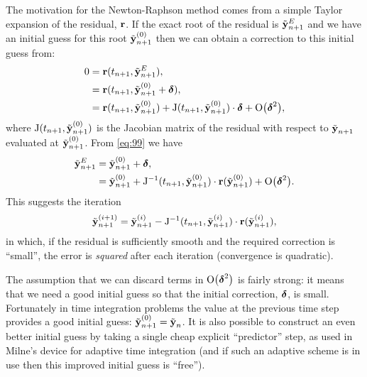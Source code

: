 The motivation for the Newton-Raphson method comes from a simple Taylor expansion of the residual, $\boldsymbol{\mathrm{r}}$.
If the exact root of the residual is $\tilde{\boldsymbol{\mathrm{y}}}^E_{n+1}$ and we have an initial guess for this root ${\tilde{\boldsymbol{\mathrm{y}}}_{n+1}}^{(0)}$ then we can obtain a correction to this initial guess from:
\begin{equation}
  \begin{aligned}
    0 &= \boldsymbol{\mathrm{r}}(t_{n+1},\tilde{\boldsymbol{\mathrm{y}}}^E_{n+1}), \\
    &= \boldsymbol{\mathrm{r}}(t_{n+1}, {\tilde{\boldsymbol{\mathrm{y}}}_{n+1}}^{(0)} + \boldsymbol{\mathrm{\delta}}), \\
    &= \boldsymbol{\mathrm{r}}(t_{n+1}, {\tilde{\boldsymbol{\mathrm{y}}}_{n+1}}^{(0)}) + \mathrm{J}(t_{n+1}, {\tilde{\boldsymbol{\mathrm{y}}}_{n+1}}^{(0)}) \cdot \boldsymbol{\mathrm{\delta}} + \mathrm{O}{\left( \boldsymbol{\mathrm{\delta}}^2 \right)},
    \label{eq:99}
  \end{aligned}
\end{equation}
where $\mathrm{J}(t_{n+1}, {\tilde{\boldsymbol{\mathrm{y}}}_{n+1}}^{(0)})$ is the Jacobian matrix of the residual with respect to $\tilde{\boldsymbol{\mathrm{y}}}_{n+1}$ evaluated at ${\tilde{\boldsymbol{\mathrm{y}}}_{n+1}}^{(0)}$.
From \cref{eq:99} we have
\begin{equation}
  \begin{aligned}
    \label{eq:49}
    \tilde{\boldsymbol{\mathrm{y}}}^E_{n+1} &= {\tilde{\boldsymbol{\mathrm{y}}}_{n+1}}^{(0)} + \boldsymbol{\mathrm{\delta}}, \\
    &= {\tilde{\boldsymbol{\mathrm{y}}}_{n+1}}^{(0)} + \mathrm{J}^{-1}(t_{n+1}, {\tilde{\boldsymbol{\mathrm{y}}}_{n+1}}^{(0)}) \cdot \boldsymbol{\mathrm{r}}({\tilde{\boldsymbol{\mathrm{y}}}_{n+1}}^{(0)}) + \mathrm{O}{\left( \boldsymbol{\mathrm{\delta}}^2 \right)}.
  \end{aligned}
\end{equation}
This suggests the iteration
\begin{equation}
  {\tilde{\boldsymbol{\mathrm{y}}}_{n+1}}^{(i+1)} = {\tilde{\boldsymbol{\mathrm{y}}}_{n+1}}^{(i)} - \mathrm{J}^{-1}(t_{n+1}, {\tilde{\boldsymbol{\mathrm{y}}}_{n+1}}^{(i)}) \cdot \boldsymbol{\mathrm{r}}({\tilde{\boldsymbol{\mathrm{y}}}_{n+1}}^{(i)}),
\end{equation}
in which, if the residual is sufficiently smooth and the required correction is ``small'', the error is \emph{squared} after each iteration (\ie convergence is quadratic).

The assumption that we can discard terms in $\mathrm{O}{\left( \boldsymbol{\mathrm{\delta}}^2 \right)}$ is fairly strong: it means that we need a good initial guess so that the initial correction, $\boldsymbol{\mathrm{\delta}}$, is small.
Fortunately in time integration problems the value at the previous time step provides a good initial guess: ${\tilde{\boldsymbol{\mathrm{y}}}_{n+1}}^{(0)} = \tilde{\boldsymbol{\mathrm{y}}}_n$.
It is also possible to construct an even better initial guess by taking a single cheap explicit ``predictor'' step, as used in Milne's device for adaptive time integration (and if such an adaptive scheme is in use then this improved initial guess is ``free'').

